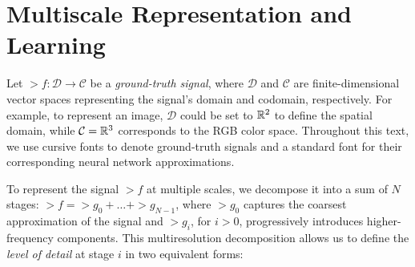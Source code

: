 







\section{Multiscale Representation and Learning}
\label{s-motivation}

Let $\gt{f}:\mathcal{D}\to \mathcal{C}$ be a \textit{ground-truth signal}, where $\mathcal{D}$ and $\mathcal{C}$ are finite-dimensional vector spaces representing the signal's domain and codomain, respectively. For example, to represent an image, $\mathcal{D}$ could be set to $\mathbb{R}^2$ to define the spatial domain, while $\mathcal{C}=\mathbb{R}^3$ corresponds to the RGB color space. Throughout this text, we use cursive fonts to denote ground-truth signals and a standard font for their corresponding neural network approximations.

To represent the signal $\gt{f}$ at multiple scales, we decompose it into a sum of $N$ stages: $\gt{f}=\gt{g}_0+\dots+\gt{g}_{N-1}$, where $\gt{g}_0$ captures the coarsest approximation of the signal and $\gt{g}_i$, for $i>0$, progressively introduces higher-frequency components. This multiresolution decomposition allows us to define the \textit{level of detail} at stage $i$ in two equivalent forms:

